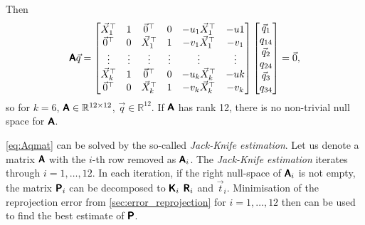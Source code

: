 Then
\begin{equation}
    \label{eq:Aqmat}
    \pmb{\mathsf{A}} \vec{q} = \begin{bmatrix}
        \vec{X}_1^\top & 1 & \vec{0}^\top & 0 & -u_1 \vec{X}_1^\top & -u1 \\
        \vec{0}^\top & 0 & \vec{X}_1^\top & 1 & -v_1 \vec{X}_1^\top & -v_1 \\ 
        \vdots & \vdots & \vdots & \vdots & \vdots & \vdots \\
        \vec{X}_k^\top & 1 & \vec{0}^\top & 0 & -u_k \vec{X}_k^\top & -uk \\
        \vec{0}^\top & 0 & \vec{X}_k^\top & 1 & -v_k \vec{X}_k^\top & -v_k \\ 
    \end{bmatrix} \begin{bmatrix}
        \vec{q}_1 \\ q_{14} \\ \vec{q}_2 \\ q_{24} \\ \vec{q}_3 \\ q_{34}
    \end{bmatrix} = \vec{0},
\end{equation}
so for $k=6$, $\pmb{\mathsf{A}} \in \mathbb{R}^{12 \times 12}$, $\vec{q} \in \mathbb{R}^{12}$. If $\pmb{\mathsf{A}}$ has rank 12, there is no non-trivial null space for $\pmb{\mathsf{A}}$.

\autoref{eq:Aqmat} can be solved by the so-called \textit{Jack-Knife estimation}. 
Let us denote a matrix $\pmb{\mathsf{A}}$ with the $i$-th row removed as $\pmb{\mathsf{A}}_i$. 
The \textit{Jack-Knife estimation} iterates through $i = 1, \dots, 12$.
In each iteration, if the right null-space of $\pmb{\mathsf{A}}_i$ is not empty, the matrix $\pmb{\mathsf{P}}_i$ can be decomposed to $\pmb{\mathsf{K}}_i$ $\pmb{\mathsf{R}}_i$ and $\vec{t}_i$.
Minimisation of the reprojection error from \autoref{sec:error_reprojection} for $i = 1, \dots, 12$ then can be used to find the best estimate of $\pmb{\mathsf{P}}$.

